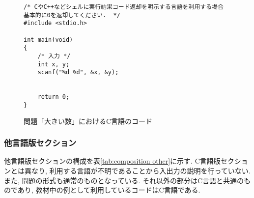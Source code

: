 \begin{figure}[H]
    \centering
\begin{lstlisting}[style = customC]
/* CやC++などシェルに実行結果コード返却を明示する言語を利用する場合 基本的に0を返却してください.  */
#include <stdio.h>

int main(void)
{
    /* 入力 */
    int x, y;
    scanf("%d %d", &x, &y);


    return 0;
}
\end{lstlisting}

\caption{問題「大きい数」におけるC言語のコード}
    \label{code:ookii c}
\end{figure}

\subsubsection{他言語版セクション}

他言語版セクションの構成を表\ref{tab:composition other}に示す. 
C言語版セクションとは異なり, 利用する言語が不明であることから入出力の説明を行っていない. 
また, 問題の形式も通常のものとなっている. 
それ以外の部分はC言語と共通のものであり, 教材中の例として利用しているコードはC言語である. 

